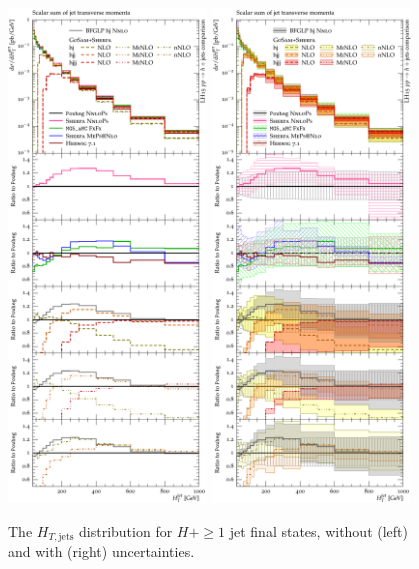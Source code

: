 {\begin{figure}[t!]
  \centering
  \includegraphics[width=0.47\textwidth]{figures/hjetscomp_u_HT_jets.pdf}
  \hfill
  \includegraphics[width=0.47\textwidth]{figures/hjetscomp_HT_jets.pdf}
  \caption{
    The $H_{T,\mathrm{jets}}$ distribution for $H+\ge1$ jet final
    states, without (left) and with (right) uncertainties.
    \label{fig:hjetscomp:results:mobs:HT_jets}
  }
\end{figure}

}
